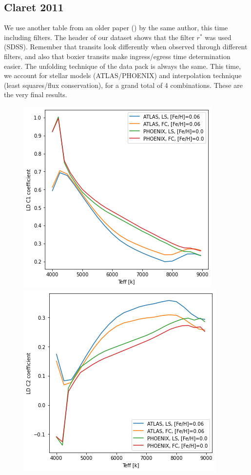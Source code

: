 \documentclass[a4paper,11pt,twocolumn]{article}
\begin{document}
\subsection{Claret 2011}
We use another table from an older paper (\cite{claret2011}) by the same author, 
this time including filters. The header of our dataset shows that the filter $r^{*}$
was used (SDSS). Remember that transits look differently 
when observed through different filters, and also that boxier transits make 
ingress/egress time determination easier. The unfolding technique of the 
data pack is always the same.
This time, we account for stellar models (ATLAS/PHOENIX) and interpolation 
technique (least squares/flux conservation), for a grand total of 4 
combinations. These are the very final results.
\begin{figure}[H]
    \centering  
    \includegraphics[scale=0.5, angle=0]{../pictures/Claret2011/c1.png}
    \includegraphics[scale=0.5, angle=0]{../pictures/Claret2011/c2.png}

\end{figure}
\end{document}
